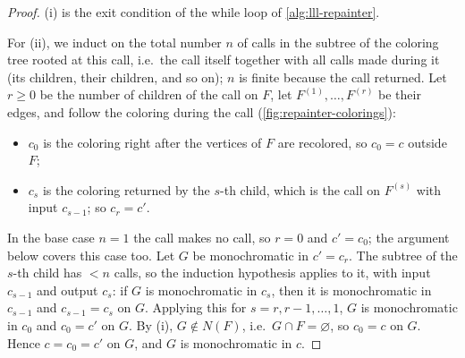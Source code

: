 \begin{proof}
    (i) is the exit condition of the while loop of \autoref{alg:lll-repainter}.

    For (ii), we induct on the total number \(n\) of calls in the subtree of the coloring tree rooted at this call, i.e.\ the call itself together with all calls made during it (its children, their children, and so on); \(n\) is finite because the call returned. Let \(r \ge 0\) be the number of children of the call on \(F\), let \(F^{(1)}, \ldots, F^{(r)}\) be their edges, and follow the coloring during the call (\autoref{fig:repainter-colorings}):
    \begin{itemize}
        \item \(c_{0}\) is the coloring right after the vertices of \(F\) are recolored, so \(c_{0} = c\) outside \(F\);
        \item \(c_{s}\) is the coloring returned by the \(s\)-th child, which is the call on \(F^{(s)}\) with input \(c_{s-1}\); so \(c_{r} = c'\).
    \end{itemize}
    In the base case \(n = 1\) the call makes no call, so \(r = 0\) and \(c' = c_{0}\); the argument below covers this case too.
    Let \(G\) be monochromatic in \(c' = c_{r}\). The subtree of the \(s\)-th child has \(< n\) calls, so the induction hypothesis applies to it, with input \(c_{s-1}\) and output \(c_{s}\): if \(G\) is monochromatic in \(c_{s}\), then it is monochromatic in \(c_{s-1}\) and \(c_{s-1} = c_{s}\) on \(G\). Applying this for \(s = r, r-1, \ldots, 1\), \(G\) is monochromatic in \(c_{0}\) and \(c_{0} = c'\) on \(G\). By (i), \(G \notin N(F)\), i.e.\ \(G \cap F = \varnothing\), so \(c_{0} = c\) on \(G\). Hence \(c = c_{0} = c'\) on \(G\), and \(G\) is monochromatic in \(c\).
\end{proof}

